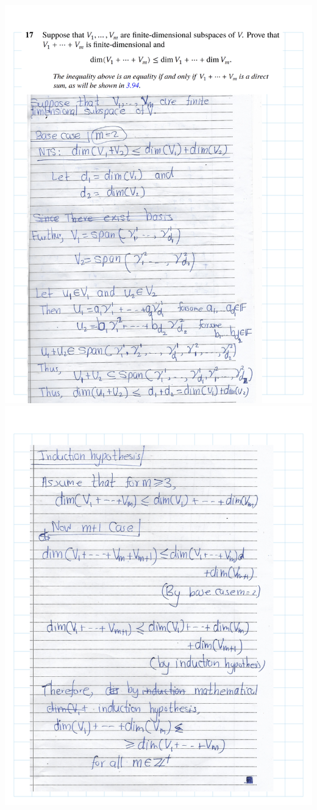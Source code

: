 \documentclass[
]{book}
\theoremstyle{definition}
\theoremstyle{definition}
\theoremstyle{definition}
\theoremstyle{definition}
\theoremstyle{remark}
\begin{document}
\includegraphics{fig/Ex 2B and 2C/Ex 2c (48).png}
\includegraphics{fig/Ex 2B and 2C/Ex 2c (49).png}
\end{document}
